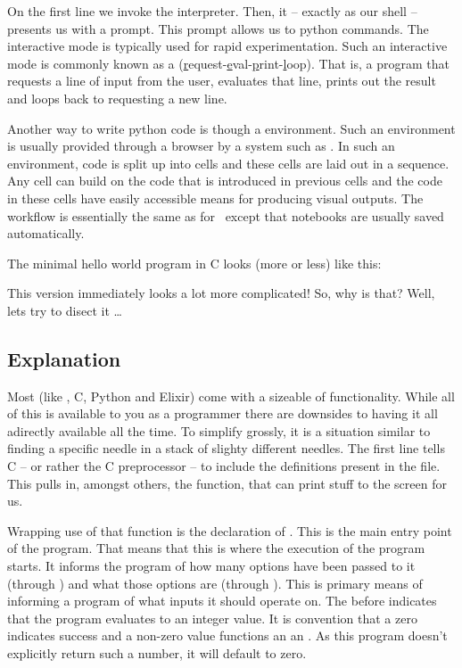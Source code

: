 On the first line we invoke the interpreter. Then, it -- exactly as our shell -- presents us with a prompt. This prompt allows us to  python commands. The interactive mode is typically used for rapid experimentation. Such an interactive mode is commonly known as a  (\underline{r}equest-\underline{e}val-\underline{p}rint-\underline{l}oop). That is, a program that requests a line of input from the user, evaluates that line, prints out the result and loops back to requesting a new line.

Another way to write python code is though a  environment. Such an environment is usually provided through a browser by a system such as . In such an environment, code is split up into cells and these cells are laid out in a sequence. Any cell can build on the code that is introduced in previous cells and the code in these cells have easily accessible means for producing visual outputs. The workflow is essentially the same as for \csharp\ except that notebooks are usually saved automatically.


The minimal hello world program in C looks (more or less) like this:


This version immediately looks a lot more complicated! So, why is that? Well, lets try to disect it \ldots

\subsection{Explanation}

Most  (like \csharp, C, Python and Elixir) come with a sizeable  of functionality. While all of this is available to you as a programmer there are downsides to having it all adirectly available all the time. To simplify grossly, it is a situation similar to finding a specific needle in a stack of slighty different needles. The first line tells C -- or rather the C preprocessor -- to include the definitions present in the  file. This pulls in, amongst others, the  function, that can print stuff to the screen for us.

Wrapping use of that  function is the declaration of . This is the main entry point of the program. That means that this is where the execution of the program starts. It informs the program of how many options have been passed to it (through ) and what those options are (through ). This is  primary means of informing a program of what inputs it should operate on. The  before  indicates that the program evaluates to an integer value. It is convention that a zero indicates success and a non-zero value functions an an . As this program doesn't explicitly return such a number, it will default to zero.

